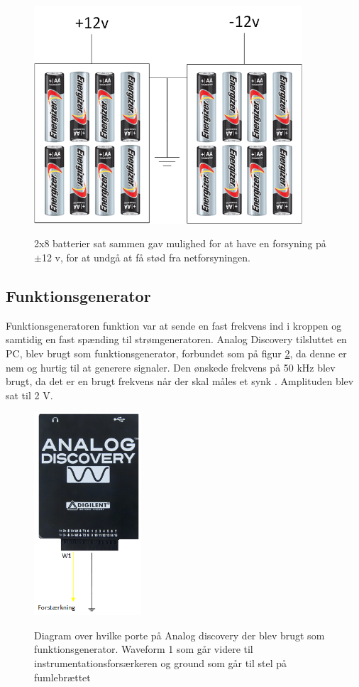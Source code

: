 \begin{figure}[H]
\centering
{\includegraphics[width=10cm]
{Figure/12vbatteri}}
\caption{2x8 batterier sat sammen gav mulighed for at have en forsyning på $\pm$12 v, for at undgå at få stød fra netforsyningen.}
\label{fig:12vbatteri}
\end{figure}

\subsection{Funktionsgenerator}
Funktionsgeneratoren funktion var at sende en fast frekvens ind i kroppen og samtidig en fast spænding til strømgeneratoren. 
Analog Discovery tilsluttet en PC, blev brugt som funktionsgenerator, forbundet som på figur \ref{fig:analogdis}, da denne er nem og hurtig til at generere signaler. Den ønskede frekvens på 50 kHz blev brugt, da det er en brugt frekvens når der skal måles et synk\cite{Kusuhara2004} \citep{Brantlov2017}. Amplituden blev sat til 2 V. 

\begin{figure}[H]
\centering
{\includegraphics[width=4cm]
{Figure/analogdis}}
\caption{Diagram over hvilke porte på Analog discovery der blev brugt  som funktionsgenerator. Waveform 1 som går videre til instrumentationsforsærkeren og ground som går til stel på fumlebrættet}
\label{fig:analogdis}
\end{figure}


